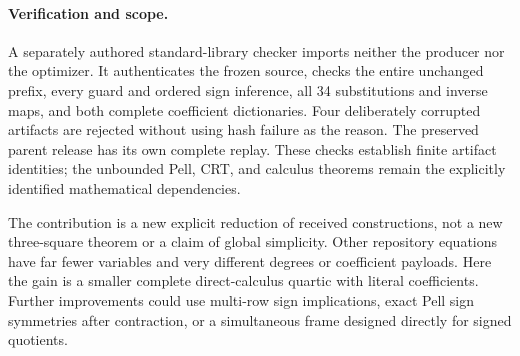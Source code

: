 \paragraph{Verification and scope.}
A separately authored standard-library checker imports neither the
producer nor the optimizer. It authenticates the frozen source, checks
the entire unchanged prefix, every guard and ordered sign inference,
all 34 substitutions and inverse maps, and both complete coefficient
dictionaries. Four deliberately corrupted artifacts are rejected without
using hash failure as the reason. The preserved parent release has its
own complete replay. These checks establish finite artifact identities;
the unbounded Pell, CRT, and calculus theorems remain the explicitly
identified mathematical dependencies.

The contribution is a new explicit reduction of received constructions,
not a new three-square theorem or a claim of global simplicity. Other
repository equations have far fewer variables and very different degrees
or coefficient payloads. Here the gain is a smaller complete direct-calculus
quartic with literal coefficients. Further improvements could use multi-row
sign implications, exact Pell sign symmetries after contraction, or a
simultaneous frame designed directly for signed quotients.
